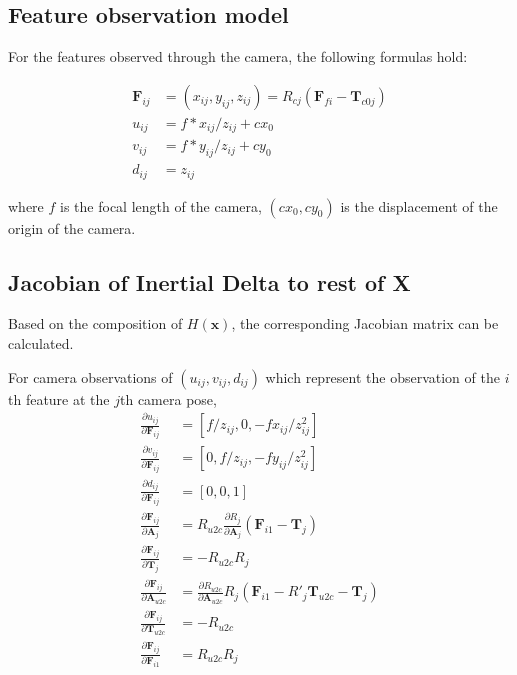\documentclass[12pt]{article}   %
\begin{document}
\subsection{Feature observation model}
For the features observed through the camera, the following formulas hold:

\begin{align}
\textbf{F}_{ij} &= (x_{ij}, y_{ij}, z_{ij}) = R_{cj} (\textbf{F}_{fi} - \textbf{T}_{c0j}) \label{formu:pij} \\
u_{ij} &= f * x_{ij} / z_{ij} + cx_0 \label{formu:uij} \\
v_{ij} &= f * y_{ij} / z_{ij} + cy_0 \label{formu:vij} \\
d_{ij} &= z_{ij} \label{formu:dij}
\end{align}

where $f$ is the focal length of the camera, $(cx_0, cy_0)$ is the displacement of the origin of the camera.

\subsection{Jacobian of Inertial Delta to rest of X}
Based on the composition of $H(\textbf{x})$, the corresponding Jacobian matrix can be calculated. 

For camera observations of $(u_{ij}, v_{ij}, d_{ij})$ which represent the observation of the $i$th feature at the $j$th camera pose, 
\begin{align}
\frac{\partial u_{ij}}{\partial \textbf{F}_{ij}} &= [f/z_{ij}, 0, -fx_{ij}/z^2_{ij}] \\
\frac{\partial v_{ij}}{\partial \textbf{F}_{ij}} &= [0, f/z_{ij}, -fy_{ij}/z^2_{ij}] \\
\frac{\partial d_{ij}}{\partial \textbf{F}_{ij}} &= [0, 0, 1] \\
\frac{\partial \textbf{F}_{ij}}{\partial \textbf{A}_{j}} &= R_{u2c} \frac{\partial R_{j}}{\partial \textbf{A}_{j}} (\textbf{F}_{i1} - \textbf{T}_{j}) \\
\frac{\partial \textbf{F}_{ij}}{\partial \textbf{T}_{j}} &= -R_{u2c} R_{j} \\
\frac{\partial \textbf{F}_{ij}}{\partial \textbf{A}_{u2c}} &= \frac{\partial R_{u2c}}{\partial \textbf{A}_{u2c}} R_{j}(\textbf{F}_{i1} - R'_{j} \textbf{T}_{u2c} - \textbf{T}_{j}) \\
\frac{\partial \textbf{F}_{ij}}{\partial \textbf{T}_{u2c}} &= -R_{u2c}\\
\frac{\partial \textbf{F}_{ij}}{\partial \textbf{F}_{i1}} &= R_{u2c} R_{j} 
\end{align}
\end{document}
